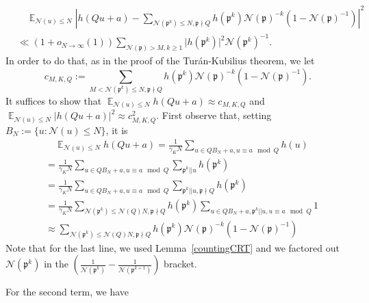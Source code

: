 \documentclass[11pt]{amsart}
\theoremstyle{definition}
\DeclareMathOperator*{\E}{\mathbb{E}}
\newcommand{\NN}{{\mathcal N}}
\newcommand{\mf}{\mathfrak}
\begin{document}
\begin{equation}
    \begin{split}
        &\quad \E_{\NN(u) \leq N}\left| h(Qu+a)-\sum_{\NN(\mf p^{k})\leq N,\mf p\nmid Q}h(\mf p^{k})\NN(\mf p)^{-k}(1-\NN(\mf p)^{-1})\right|^{2}
        \\&\ll (1+o_{N\to\infty}(1)) \sum_{\NN(\mf p)>M, k\geq 1}\vert h(\mf p^{k})\vert^{2}\NN(\mf p^{k})^{-1}.
    \end{split}
\end{equation}
In order to do that, as in the proof of the Tur\'an-Kubilius theorem, we let 
$$c_{M,K,Q}:=\sum_{M<\NN(\mf p^{k})\leq N,\mf p\nmid Q}h(\mf p^{k})\NN(\mf p)^{-k}(1-\NN(\mf p)^{-1}).$$ It suffices to show that 
$\E_{\NN(u) \leq N}h(Qu+a)\approx c_{M,K,Q}$ and $\E_{\NN(u) \leq N}\vert h(Qu+a)\vert^{2}\approx c_{M,K,Q}^{2}$.
First observe that, setting $B_N:=\{ u : \NN(u) \leq N\}$, it is
\begin{equation}\label{firstTK}
    \begin{split}
        &\quad \E_{\NN(u) \leq N}h(Qu+a)
        =\frac{1}{\gamma_{K} N}\sum_{u\in QB_N+a, u\equiv a \mod Q}h(u)
        \\&=\frac{1}{\gamma_{K} N}\sum_{u\in QB_N+a, u\equiv a \mod Q}\sum_{\mf p^{k}|| u} h(\mf p^{k})
        \\&=\frac{1}{\gamma_{K} N}\sum_{u\in QB_N+a, u\equiv a \mod Q}\sum_{\mf p^{k}|| u, \mf p\nmid Q} h(\mf p^{k})
        \\&=\frac{1}{\gamma_{K} N}\sum_{\NN(\mf p^{k})\leq \NN(Q)N, \mf p\nmid Q}h(\mf p^{k})\sum_{u\in QB_N+a, \mf p^{k}||u, u\equiv a \mod Q} 1
    \\& \approx \sum_{\NN(\mf p^{k})\leq \NN(Q)N, \mf p\nmid Q}h(\mf p^{k})\NN(\mf p)^{-k}(1-\NN(\mf p)^{-1})
    \end{split}
\end{equation}
Note that for the last line, we used Lemma~\ref{countingCRT} and we factored out $\NN(\mf p^k)$ in the $\left( \frac{1}{\NN(\mf p^k)}-\frac{1}{\NN(\mf p^{k+1})}\right)$ bracket.

For the second term, we have
\end{document}

